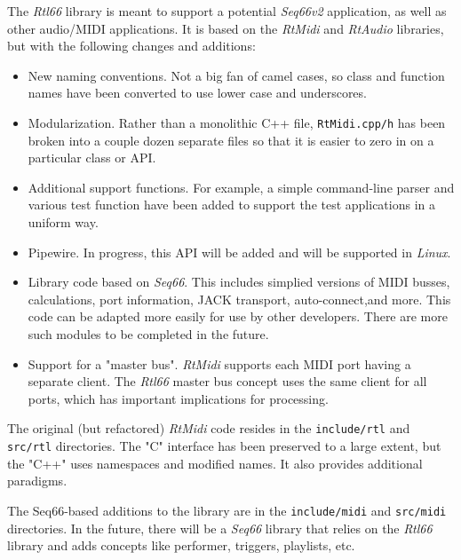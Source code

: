 \documentclass[
 11pt,
 twoside,
 a4paper,
 final                                 %
]{article}
\begin{document}
   The \textsl{Rtl66} library is meant to support a potential
   \textsl{Seq66v2} application, as well as other audio/MIDI
   applications.
   It is based on the \textsl{RtMidi} \cite{rtmidi} and
   \textsl{RtAudio} \cite{rtaudio} libraries,
   but with the following changes and additions:

   \begin{itemize}
      \item New naming conventions.  Not a big fan of camel cases, so
         class and function names have been converted to use lower case
         and underscores.
      \item Modularization.  Rather than a monolithic C++ file,
         \texttt{RtMidi.cpp/h} has been broken into a couple dozen separate
         files so that it is easier to zero in on a particular class or
         API.
      \item Additional support functions.  For example, a simple command-line
         parser and various test function have
         been added to support the test applications in a uniform way.
      \item Pipewire. In progress, this API will be added and will be
         supported in \textsl{Linux}.
      \item Library code based on \textsl{Seq66}.
         This includes simplied versions of MIDI busses, calculations,
         port information, JACK transport, auto-connect,and more.
         This code can be adapted more easily
         for use by other developers.
         There are more such modules to be completed in the future.
      \item Support for a "master bus".
         \textsl{RtMidi} supports each MIDI port having a separate client.
         The \textsl{Rtl66} master bus concept uses the same client for all
         ports, which has important implications for processing.
   \end{itemize}

   The original (but refactored) \textsl{RtMidi} code resides in the
   \texttt{include/rtl} and \texttt{src/rtl} directories.
   The "C" interface has been preserved to a large extent, but the
   "C++" uses namespaces and modified names.
   It also provides additional paradigms.

   The Seq66-based additions to the library are in the
   \texttt{include/midi} and \texttt{src/midi} directories.
   In the future, there will be a \textsl{Seq66} library that
   relies on the \textsl{Rtl66} library and adds concepts like
   performer, triggers, playlists, etc.
\end{document}
